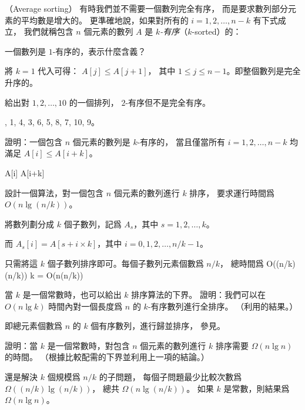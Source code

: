 \startPROBLEM
（Average sorting）
有時我們並不需要一個數列完全有序，
而是要求數列部分元素的平均數是增大的。
更準確地說，如果對所有的 $i=1,2,\ldots,n-k$ 有下式成立，
我們就稱包含 $n$ 個元素的數列 $A$ 是 \emph{$k$-有序}（$k$-sorted）的：
\startformula
{}
 \le {}
\stopformula

\startigBase[a]\startitem
一個數列是 $1$-有序的，表示什麼含義？
\stopitem\stopigBase

\startANSWER
將 $k=1$ 代入可得： $A[j] \le A[j+1]$，
其中 $1 \le j \le n-1$。即整個數列是完全升序的。
\stopANSWER

\startigBase[a,continue]\startitem
給出對 $1,2,\ldots,10$ 的一個排列，
 $2$-有序但不是完全有序。
\stopitem\stopigBase

, 1, 4, 3, 6, 5, 8, 7, 10, 9。
\stopANSWER

\startigBase[a,continue]\startitem
證明：一個包含 $n$ 個元素的數列是 $k$-有序的，
當且僅當所有 $i=1,2,\ldots,n-k$ 均滿足 $A[i]\le A[i+k]$。
\stopitem\stopigBase

\startANSWER
\startsplitformula\startmathalignment[n=1]
\NC {} \le {} \NR
\NC \Updownarrow \NR
\NC {} \le
      \NR
\NC \Updownarrow \NR
\NC {} \le {} \NR
\NC \Updownarrow \NR
\NC A[i] \le A[i+k] \NR
\stopmathalignment\stopsplitformula
\stopANSWER

\startigBase[a,continue]\startitem
設計一個算法，對一個包含 $n$ 個元素的數列進行 $k$ 排序，
要求運行時間爲 $O(n\lg(n/k))$。
\stopitem\stopigBase

\startANSWER
將數列劃分成 $k$ 個子數列，記爲 $A_s$，其中 $s=1,2,\ldots,k$。

而 $A_s[i] = A[s + i \times k]$，其中 $i=0,1,2,\ldots,n/k-1$。

只需將這 $k$ 個子數列排序即可。每個子數列元素個數爲 $n/k$，
總時間爲
\startformula
O((n/k)\lg(n/k)) \times k = O(n\lg(n/k))
\stopformula
\stopANSWER

當 $k$ 是一個常數時，也可以給出 $k$ 排序算法的下界。
\startigBase[a,continue]\startitem
證明：我們可以在 $O(n\lg{k})$ 時間內對一個長度爲 $n$ 的 $k$-有序數列進行全排序。
（\hint 利用\inexercise[k_merge] 的結果。）
\stopitem\stopigBase

\startANSWER
即總元素個數爲 $n$ 的 $k$ 個有序數列，進行歸並排序，
參見\inexercise[k_merge]。
\stopANSWER

\startigBase[a,continue]\startitem
證明：當 $k$ 是一個常數時，對包含 $n$ 個元素的數列進行 $k$ 排序需要 $\Omega(n\lg{n})$ 的時間。
（\hint 根據比較配需的下界並利用上一項的結論。）
\stopitem\stopigBase

\startANSWER
還是解決 $k$ 個規模爲 $n/k$ 的子問題，
每個子問題最少比較次數爲 $\Omega((n/k)\lg(n/k))$，
總共 $\Omega(n\lg(n/k))$。
如果 $k$ 是常數，則結果爲 $\Omega(n\lg n)$。
\stopANSWER

\stopPROBLEM
